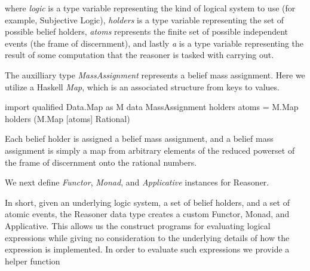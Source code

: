 \documentclass[a4paper]{report}
\begin{document}
where \emph{logic} is a type variable representing the kind of logical system to
use (for example, Subjective Logic), \emph{holders} is a type variable representing
the set of possible belief holders, \emph{atoms} represents the finite set of possible
independent events (the frame of discernment), and lastly \emph{a} is a type variable
representing the result of some computation that the reasoner is tasked with carrying
out.

\par
The auxilliary type \emph{MassAssignment} represents a belief mass assignment. Here
we utilize a Haskell \emph{Map}, which is an associated structure from keys to values.

\begin{code}
import qualified Data.Map as M
data MassAssignment holders atoms = M.Map holders (M.Map [atoms] Rational)
\end{code}

Each belief holder is assigned a belief mass assignment, and a belief mass assignment
is simply a map from arbitrary elements of the reduced powerset of the frame of discernment
onto the rational numbers.

\par
We next define \emph{Functor}, \emph{Monad}, and \emph{Applicative} instances for
Reasoner.


\par
In short, given an underlying logic system, a set of belief holders, and a set of
atomic events, the Reasoner data type creates a custom Functor, Monad, and Applicative.
This allows us the construct programs for evaluating logical expressions while giving no
consideration to the underlying details of how the expression is implemented. In order
to evaluate such expressions we provide a helper function
\end{document}
